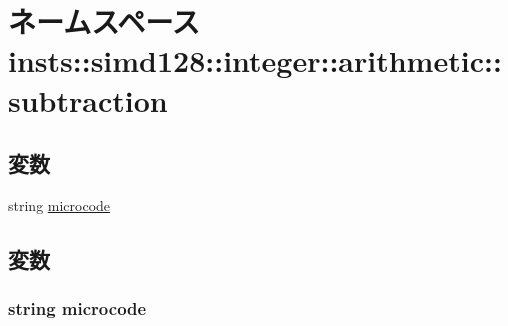 \hypertarget{namespaceinsts_1_1simd128_1_1integer_1_1arithmetic_1_1subtraction}{
\section{ネームスペース insts::simd128::integer::arithmetic::subtraction}
\label{namespaceinsts_1_1simd128_1_1integer_1_1arithmetic_1_1subtraction}
}
\subsection*{変数}
\begin{DoxyCompactItemize}
\item 
string \hyperlink{namespaceinsts_1_1simd128_1_1integer_1_1arithmetic_1_1subtraction_a770f11a173e99389a8802f0107ed8f52}{microcode}
\end{DoxyCompactItemize}


\subsection{変数}
\hypertarget{namespaceinsts_1_1simd128_1_1integer_1_1arithmetic_1_1subtraction_a770f11a173e99389a8802f0107ed8f52}{
\subsubsection[{microcode}]{\setlength{\rightskip}{0pt plus 5cm}string {\bf microcode}}}
\label{namespaceinsts_1_1simd128_1_1integer_1_1arithmetic_1_1subtraction_a770f11a173e99389a8802f0107ed8f52}
